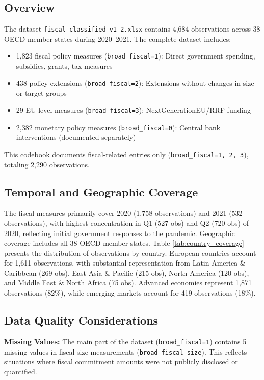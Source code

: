 \documentclass[12pt]{article}
\begin{document}
\subsection{Overview}

The dataset \texttt{fiscal\_classified\_v1\_2.xlsx} contains 4,684 observations across 38 OECD member states during 2020--2021. The complete dataset includes:

\begin{itemize}
\item 1,823 fiscal policy measures (\texttt{broad\_fiscal=1}): Direct government spending, subsidies, grants, tax measures
\item 438 policy extensions (\texttt{broad\_fiscal=2}): Extensions without changes in size or target groups
\item 29 EU-level measures (\texttt{broad\_fiscal=3}): NextGenerationEU/RRF funding
\item 2,382 monetary policy measures (\texttt{broad\_fiscal=0}): Central bank interventions (documented separately)
\end{itemize}

This codebook documents fiscal-related entries only (\texttt{broad\_fiscal=1, 2, 3}), totaling 2,290 observations.

\subsection{Temporal and Geographic Coverage}

The fiscal measures primarily cover 2020 (1,758 observations) and 2021 (532 observations), with highest concentration in Q1 (527 obs) and Q2 (720 obs) of 2020, reflecting initial government responses to the pandemic. Geographic coverage includes all 38 OECD member states. Table \ref{tab:country_coverage} presents the distribution of observations by country. European countries account for 1,611 observations, with substantial representation from Latin America \& Caribbean (269 obs), East Asia \& Pacific (215 obs), North America (120 obs), and Middle East \& North Africa (75 obs). Advanced economies represent 1,871 observations (82\%), while emerging markets account for 419 observations (18\%).

\subsection{Data Quality Considerations}

\textbf{Missing Values:} The main part of the dataset (\texttt{broad\_fiscal=1}) contains 5 missing values in fiscal size measurements (\texttt{broad\_fiscal\_size}). This reflects situations where fiscal commitment amounts were not publicly disclosed or quantified.
\end{document}
